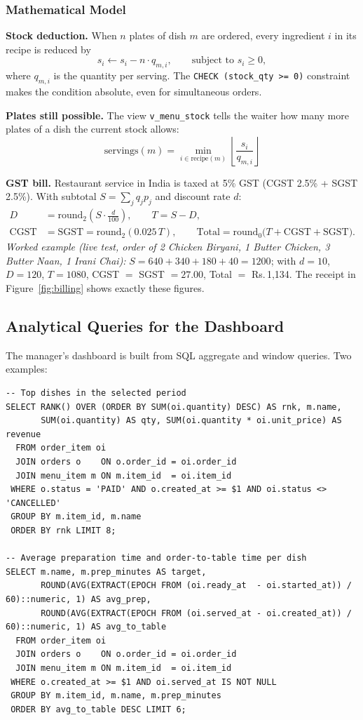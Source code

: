 \documentclass[11pt,a4paper]{report}
\begin{document}
\subsubsection{Mathematical Model}
\textbf{Stock deduction.} When $n$ plates of dish $m$ are ordered, every ingredient $i$ in its recipe is reduced by
$$s_i \leftarrow s_i - n \cdot q_{m,i}, \qquad \text{subject to } s_i \ge 0,$$
where $q_{m,i}$ is the quantity per serving. The \texttt{CHECK (stock\_qty >= 0)} constraint makes the condition absolute, even for simultaneous orders.

\textbf{Plates still possible.} The view \texttt{v\_menu\_stock} tells the waiter how many more plates of a dish the current stock allows:
$$\text{servings}(m) = \min_{i \in \text{recipe}(m)} \left\lfloor \frac{s_i}{q_{m,i}} \right\rfloor$$

\textbf{GST bill.} Restaurant service in India is taxed at 5\% GST (CGST 2.5\% + SGST 2.5\%). With subtotal $S = \sum_j q_j p_j$ and discount rate $d$:
\begin{align*}
D &= \text{round}_2\!\left(S \cdot \tfrac{d}{100}\right), \qquad T = S - D,\\
\text{CGST} &= \text{SGST} = \text{round}_2(0.025\,T), \qquad
\text{Total} = \text{round}_0\big(T + \text{CGST} + \text{SGST}\big).
\end{align*}
\textit{Worked example (live test, order of 2 Chicken Biryani, 1 Butter Chicken, 3 Butter Naan, 1 Irani Chai):} $S = 640 + 340 + 180 + 40 = 1200$; with $d = 10$, $D = 120$, $T = 1080$, CGST $=$ SGST $= 27.00$, Total $=$ Rs.\,1,134. The receipt in Figure~\ref{fig:billing} shows exactly these figures.

\subsection{Analytical Queries for the Dashboard}
The manager's dashboard is built from SQL aggregate and window queries. Two examples:

\begin{lstlisting}[caption={Top dishes (window function) and kitchen speed}]
-- Top dishes in the selected period
SELECT RANK() OVER (ORDER BY SUM(oi.quantity) DESC) AS rnk, m.name,
       SUM(oi.quantity) AS qty, SUM(oi.quantity * oi.unit_price) AS revenue
  FROM order_item oi
  JOIN orders o    ON o.order_id = oi.order_id
  JOIN menu_item m ON m.item_id  = oi.item_id
 WHERE o.status = 'PAID' AND o.created_at >= $1 AND oi.status <> 'CANCELLED'
 GROUP BY m.item_id, m.name
 ORDER BY rnk LIMIT 8;

-- Average preparation time and order-to-table time per dish
SELECT m.name, m.prep_minutes AS target,
       ROUND(AVG(EXTRACT(EPOCH FROM (oi.ready_at  - oi.started_at)) / 60)::numeric, 1) AS avg_prep,
       ROUND(AVG(EXTRACT(EPOCH FROM (oi.served_at - oi.created_at)) / 60)::numeric, 1) AS avg_to_table
  FROM order_item oi
  JOIN orders o    ON o.order_id = oi.order_id
  JOIN menu_item m ON m.item_id  = oi.item_id
 WHERE o.created_at >= $1 AND oi.served_at IS NOT NULL
 GROUP BY m.item_id, m.name, m.prep_minutes
 ORDER BY avg_to_table DESC LIMIT 6;
\end{lstlisting}
\end{document}

